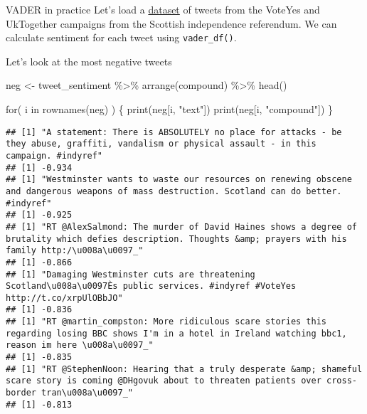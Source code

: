 \documentclass[
  10pt,
  ignorenonframetext,
  aspectratio=169]{beamer}
\newenvironment{Shaded}{\begin{snugshade}}{\end{snugshade}}
\newcommand{\ControlFlowTok}[1]{\textcolor[rgb]{0.94,0.87,0.69}{#1}}
\newcommand{\FunctionTok}[1]{\textcolor[rgb]{0.94,0.94,0.56}{#1}}
\newcommand{\NormalTok}[1]{\textcolor[rgb]{0.80,0.80,0.80}{#1}}
\newcommand{\OtherTok}[1]{\textcolor[rgb]{0.94,0.94,0.56}{#1}}
\newcommand{\SpecialCharTok}[1]{\textcolor[rgb]{0.86,0.64,0.64}{#1}}
\newcommand{\StringTok}[1]{\textcolor[rgb]{0.80,0.58,0.58}{#1}}
\begin{document}
\begin{frame}[fragile]{VADER in practice}
\protect\hypertarget{vader-in-practice-1}{}
Let's load a \href{https://doi.org/10.7910/DVN/RQ7P1F}{dataset} of
tweets from the VoteYes and UkTogether campaigns from the Scottish
independence referendum. We can calculate sentiment for each tweet using
\texttt{vader\_df()}.

Let's look at the most negative tweets

\medskip
\scriptsize

\begin{Shaded}
\begin{Highlighting}[]
\NormalTok{neg }\OtherTok{\textless{}{-}}\NormalTok{ tweet\_sentiment }\SpecialCharTok{\%\textgreater{}\%} \FunctionTok{arrange}\NormalTok{(compound) }\SpecialCharTok{\%\textgreater{}\%} 
  \FunctionTok{head}\NormalTok{()}

\ControlFlowTok{for}\NormalTok{( i }\ControlFlowTok{in} \FunctionTok{rownames}\NormalTok{(neg) ) \{}
  \FunctionTok{print}\NormalTok{(neg[i, }\StringTok{"text"}\NormalTok{])}
  \FunctionTok{print}\NormalTok{(neg[i, }\StringTok{"compound"}\NormalTok{])}
\NormalTok{\}}
\end{Highlighting}
\end{Shaded}

\begin{verbatim}
## [1] "A statement: There is ABSOLUTELY no place for attacks - be they abuse, graffiti, vandalism or physical assault - in this campaign. #indyref"
## [1] -0.934
## [1] "Westminster wants to waste our resources on renewing obscene and dangerous weapons of mass destruction. Scotland can do better. #indyref"
## [1] -0.925
## [1] "RT @AlexSalmond: The murder of David Haines shows a degree of brutality which defies description. Thoughts &amp; prayers with his family http:/\u008a\u0097_"
## [1] -0.866
## [1] "Damaging Westminster cuts are threatening Scotland\u008a\u0097Ès public services. #indyref #VoteYes http://t.co/xrpUlOBbJO"
## [1] -0.836
## [1] "RT @martin_compston: More ridiculous scare stories this regarding losing BBC shows I'm in a hotel in Ireland watching bbc1, reason im here \u008a\u0097_"
## [1] -0.835
## [1] "RT @StephenNoon: Hearing that a truly desperate &amp; shameful scare story is coming @DHgovuk about to threaten patients over cross-border tran\u008a\u0097_"
## [1] -0.813
\end{verbatim}
\end{frame}
\end{document}
